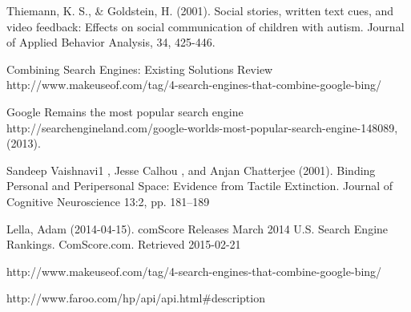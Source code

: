 \documentclass[10pt]{article}
\begin{document}
\begin{thebibliography}{100}
Thiemann, K. S., \& Goldstein, H. (2001). Social stories, written text cues, and video feedback: Effects on social communication of children with autism. Journal of Applied Behavior Analysis, 34, 425-446.


Combining Search Engines: Existing Solutions Review
http://www.makeuseof.com/tag/4-search-engines-that-combine-google-bing/


Google Remains the most popular search engine http://searchengineland.com/google-worlds-most-popular-search-engine-148089, (2013).  


Sandeep Vaishnavi1 , Jesse Calhou , and Anjan Chatterjee (2001). Binding Personal and Peripersonal Space: Evidence from Tactile Extinction. Journal of Cognitive Neuroscience 13:2, pp. 181–189


Lella, Adam (2014-04-15). comScore Releases March 2014 U.S. Search Engine Rankings. ComScore.com. Retrieved 2015-02-21



 http://www.makeuseof.com/tag/4-search-engines-that-combine-google-bing/


http://www.faroo.com/hp/api/api.html\#description

\end{thebibliography}
\end{document}

